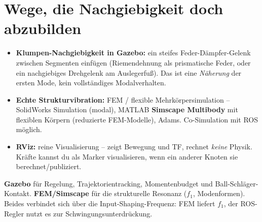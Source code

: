 \section{Wege, die Nachgiebigkeit doch abzubilden}
\begin{itemize}
\item \textbf{Klumpen-Nachgiebigkeit in Gazebo:} ein steifes Feder-Dämpfer-Gelenk
  zwischen Segmenten einfügen (Riemendehnung als prismatische Feder, oder ein
  nachgiebiges Drehgelenk am Auslegerfuß). Das ist eine \emph{Näherung} der
  ersten Mode, kein vollständiges Modalverhalten.
\item \textbf{Echte Strukturvibration:} FEM / flexible Mehrkörpersimulation --
  SolidWorks Simulation (modal), MATLAB \textbf{Simscape Multibody} mit
  flexiblen Körpern (reduzierte FEM-Modelle), Adams. Co-Simulation mit ROS
  möglich.
\item \textbf{RViz:} reine Visualisierung -- zeigt Bewegung und TF, rechnet
  \emph{keine} Physik. Kräfte kannst du als Marker visualisieren, wenn ein
  anderer Knoten sie berechnet/publiziert.
\end{itemize}

\begin{infobox}[title=Empfohlene Aufteilung]
\textbf{Gazebo} für Regelung, Trajektorientracking, Momentenbudget und
Ball-Schläger-Kontakt. \textbf{FEM/Simscape} für die strukturelle Resonanz
($f_1$, Modenformen). Beides verbindet sich über die Input-Shaping-Frequenz:
FEM liefert $f_1$, der ROS-Regler nutzt es zur Schwingungsunterdrückung.
\end{infobox}
